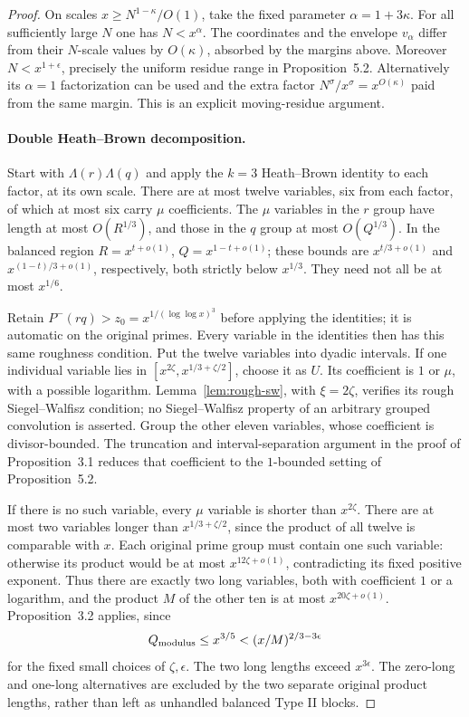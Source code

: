 \documentclass[11pt]{article}
\begin{document}
\begin{proof}
On scales $x\ge N^{1-\kappa}/O(1)$, take the fixed parameter
$\alpha=1+3\kappa$. For all sufficiently large $N$ one has
$N<x^\alpha$.
The coordinates and the envelope $v_\alpha$ differ from their
$N$-scale values by $O(\kappa)$, absorbed by the margins above.
Moreover $N<x^{1+\epsilon}$, precisely the uniform residue
range in Proposition~5.2. Alternatively its $\alpha=1$
factorization can be used and the extra factor
$N^\sigma/x^\sigma=x^{O(\kappa)}$ paid from the same margin.
This is an explicit moving-residue argument.

\paragraph{Double Heath--Brown decomposition.}
Start with $\Lambda(r)\Lambda(q)$ and apply the $k=3$
Heath--Brown identity to each factor, at its own scale.
There are at most twelve variables, six from each factor,
of which at most six carry $\mu$ coefficients.
The $\mu$ variables in the $r$ group have length at most
$O(R^{1/3})$, and those in the $q$ group at most $O(Q^{1/3})$.
In the balanced region $R=x^{t+o(1)}$, $Q=x^{1-t+o(1)}$;
these bounds are $x^{t/3+o(1)}$ and $x^{(1-t)/3+o(1)}$,
respectively, both strictly below $x^{1/3}$.
They need not all be at most $x^{1/6}$.

Retain $P^-(rq)>z_0=x^{1/(\log\log x)^3}$ before applying
the identities; it is automatic on the original primes.
Every variable in the identities then has this same roughness
condition. Put the twelve variables into dyadic intervals.
If one individual variable lies in
$[x^{2\zeta},x^{1/3+\zeta/2}]$, choose it as $U$.
Its coefficient is $1$ or $\mu$, with a possible logarithm.
Lemma~\ref{lem:rough-sw}, with $\xi=2\zeta$, verifies its
rough Siegel--Walfisz condition; no Siegel--Walfisz property
of an arbitrary grouped convolution is asserted.
Group the other eleven variables, whose coefficient is
divisor-bounded. The truncation and interval-separation argument
in the proof of Proposition~3.1 reduces that coefficient to the
$1$-bounded setting of Proposition~5.2.

If there is no such variable, every $\mu$ variable is shorter
than $x^{2\zeta}$. There are at most two variables longer than
$x^{1/3+\zeta/2}$, since the product of all twelve is comparable
with $x$. Each original prime group must contain one such
variable: otherwise its product would be at most
$x^{12\zeta+o(1)}$, contradicting its fixed positive exponent.
Thus there are exactly two long variables, both with coefficient
$1$ or a logarithm, and the product $M$ of the other ten is at
most $x^{20\zeta+o(1)}$.
Proposition~3.2 applies, since
\[
 Q_{\rm modulus}\le x^{3/5}
   <(x/M)^{2/3-3\epsilon}
\]
for the fixed small choices of $\zeta,\epsilon$.
The two long lengths exceed $x^{3\epsilon}$.
The zero-long and one-long alternatives are excluded by the
two separate original product lengths, rather than left as
unhandled balanced Type II blocks.


\end{proof}
\end{document}
